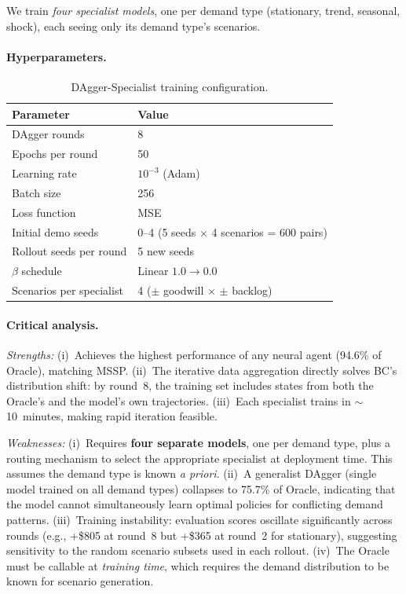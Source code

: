 We train \emph{four specialist models}, one per demand type (stationary,
trend, seasonal, shock), each seeing only its demand type's scenarios.

\paragraph{Hyperparameters.}

\begin{table}[htbp]
\centering
\caption{DAgger-Specialist training configuration.}
\label{tab:dagger_hparams}
\small
\begin{tabular}{ll}
\toprule
\textbf{Parameter} & \textbf{Value} \\
\midrule
DAgger rounds & 8 \\
Epochs per round & 50 \\
Learning rate & $10^{-3}$ (Adam) \\
Batch size & 256 \\
Loss function & MSE \\
Initial demo seeds & 0--4 (5 seeds $\times$ 4 scenarios = 600 pairs) \\
Rollout seeds per round & 5 new seeds \\
$\beta$ schedule & Linear $1.0 \to 0.0$ \\
Scenarios per specialist & 4 ($\pm$ goodwill $\times$ $\pm$ backlog) \\
\bottomrule
\end{tabular}
\end{table}

\paragraph{Critical analysis.}
\emph{Strengths:} (i)~Achieves the highest performance of any neural agent
(94.6\% of Oracle), matching MSSP. (ii)~The iterative data aggregation
directly solves BC's distribution shift: by round~8, the training set
includes states from both the Oracle's and the model's own trajectories.
(iii)~Each specialist trains in $\sim$10~minutes, making rapid iteration
feasible.

\emph{Weaknesses:} (i)~Requires \textbf{four separate models}, one per
demand type, plus a routing mechanism to select the appropriate specialist
at deployment time. This assumes the demand type is known \emph{a priori}.
(ii)~A generalist DAgger (single model trained on all demand types) collapses
to 75.7\% of Oracle, indicating that the model cannot simultaneously learn
optimal policies for conflicting demand patterns. (iii)~Training instability:
evaluation scores oscillate significantly across rounds (e.g., +\$805 at
round~8 but +\$365 at round~2 for stationary), suggesting sensitivity to
the random scenario subsets used in each rollout. (iv)~The Oracle must be
callable at \emph{training time}, which requires the demand distribution
to be known for scenario generation.

